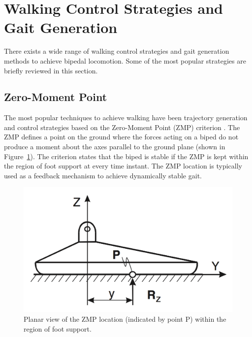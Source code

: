 


\section{Walking Control Strategies and Gait Generation} %
\label{sec:related_control_strategies}
There exists a wide range of walking control strategies and gait generation methods to achieve bipedal locomotion. Some of the most popular strategies are briefly reviewed in this section.


\subsection{Zero-Moment Point} %
\label{sub:related_zero_moment_point}
The most popular techniques to achieve walking have been trajectory generation and control strategies based on the Zero-Moment Point (ZMP) criterion \cite{Vukobratovic:2004wy}. The ZMP defines a point on the ground where the forces acting on a biped do not produce a moment about the axes parallel to the ground plane (shown in Figure~\ref{fig:zmp}). The criterion states that the biped is stable if the ZMP is kept within the region of foot support at every time instant. The ZMP location is typically used as a feedback mechanism to achieve dynamically stable gait.  

\begin{figure}[!h]
	\begin{center}
    \includegraphics[scale=0.3]{fig/background/zmp.png}
	\end{center}
  \caption{Planar view of the ZMP location (indicated by point P) within the region of foot support.}
  \label{fig:zmp}
\end{figure}

